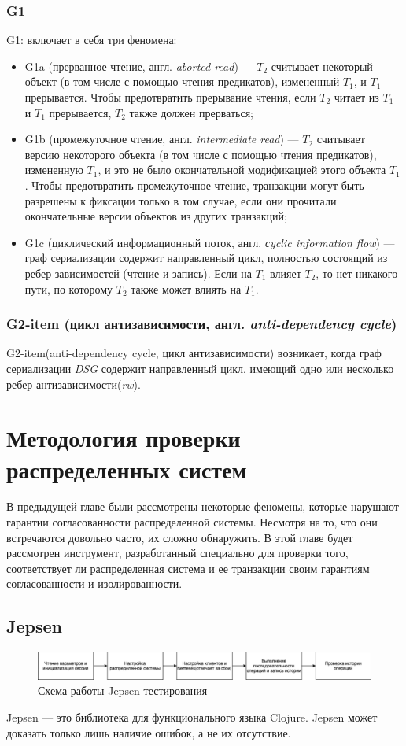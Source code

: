 \documentclass[14pt,  openany]{book}
\begin{document}
\subsection{G1}
G1: включает в себя три феномена: 
\begin{itemize}
\item G1a (прерванное чтение, англ. \textit{aborted read}) --- $T_2$ считывает некоторый объект (в том числе с помощью чтения предикатов), измененный $T_1$, и $T_1$ прерывается. Чтобы предотвратить прерывание чтения, если $T_2$ читает из $T_1$ и $T_1$ прерывается, $T_2$ также должен прерваться;
\item G1b (промежуточное чтение, англ. \textit{intermediate read}) --- $T_2$ считывает версию некоторого объекта (в том числе с помощью чтения предикатов), измененную $T_1$, и это не было окончательной модификацией этого объекта $T_1$. Чтобы предотвратить промежуточное чтение, транзакции могут быть разрешены к фиксации только в том случае, если они прочитали окончательные версии объектов из других транзакций;
\item G1c (циклический информационный поток, англ. \textit{сyclic information flow}) --- граф сериализации содержит направленный цикл, полностью состоящий из ребер зависимостей (чтение и запись). Если на $T_1$ влияет $T_2$, то нет никакого пути, по которому $T_2$ также может влиять на $T_1$.
\end{itemize}

\subsection{G2-item (цикл антизависимости, англ. \textit{anti-dependency cycle})}
G2-item(anti-dependency cycle, цикл антизависимости) возникает, когда граф сериализации \textit{DSG} содержит направленный цикл, имеющий одно или несколько ребер антизависимости(\textit{rw}). 

\chapter{Методология проверки распределенных систем}
В предыдущей главе были рассмотрены некоторые феномены, которые нарушают гарантии согласованности распределенной системы. Несмотря на то, что они встречаются довольно часто, их сложно обнаружить.  В этой главе будет рассмотрен инструмент, разработанный специально для проверки того, соответствует ли распределенная система и ее транзакции своим гарантиям согласованности и изолированности.
\section{Jepsen}
\begin{figure}[H]
  \includegraphics[width=\textwidth]{jepsen.jpeg}
  \caption{Схема работы Jepsen-тестирования}
\end{figure}
\par Jepsen --- это библиотека для функционального языка Clojure. Jepsen может доказать только лишь наличие ошибок, а не их отсутствие.
\end{document}
